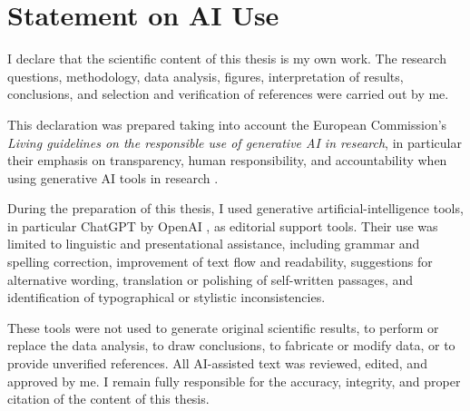 \documentclass[main.tex]{subfiles}
\begin{document}
\chapter{Statement on AI Use}
\label{app:ai-use}

I declare that the scientific content of this thesis is my own work.
The research questions, methodology, data analysis, figures, interpretation of results, conclusions, and selection and verification of references were carried out by me.

This declaration was prepared taking into account the European Commission's \emph{Living guidelines on the responsible use of generative AI in research}, in particular their emphasis on transparency, human responsibility, and accountability when using generative AI tools in research
\cite{europeancommission2026genai}.

During the preparation of this thesis, I used generative artificial-intelligence tools, in particular ChatGPT by OpenAI \cite{openai2026chatgpt}, as editorial support tools.
Their use was limited to linguistic and presentational assistance, including grammar and spelling correction, improvement of text flow and readability, suggestions for alternative wording, translation or polishing of self-written passages, and identification of typographical or stylistic inconsistencies.

These tools were not used to generate original scientific results, to perform or replace the data analysis, to draw conclusions, to fabricate or modify data, or to provide unverified references.
All AI-assisted text was reviewed, edited, and approved by me.
I remain fully responsible for the accuracy, integrity, and proper citation of the content of this thesis.
\end{document}
